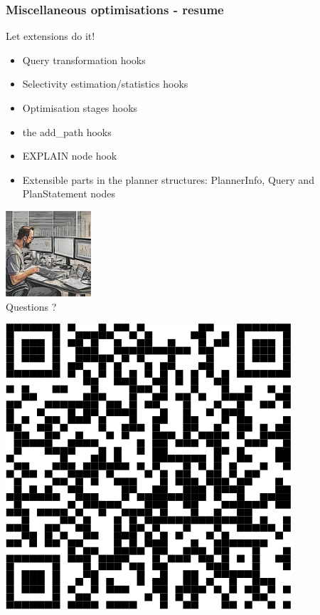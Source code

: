 \documentclass{beamer}
\begin{document}
\begin{frame}[fragile]\frametitle{Miscellaneous optimisations - resume}
Let extensions do it!
\begin{itemize}
  \item Query transformation hooks
  \item Selectivity estimation/statistics hooks
  \item Optimisation stages hooks
  \item the add\_path hooks
  \item EXPLAIN node hook
  \item Extensible parts in the planner structures: PlannerInfo, Query and PlanStatement nodes
\end{itemize}
\end{frame}


\begin{frame}
\vspace*{\fill}
\begin{center}
\includegraphics[scale=0.5]{pics/project_logo}\\
\huge{Questions ?}
\end{center}
\vspace*{\fill}
\begin{center}
\includegraphics[scale=0.1]{pics/url-supplement.png}
\end{center}
\end{frame}

\end{document}
